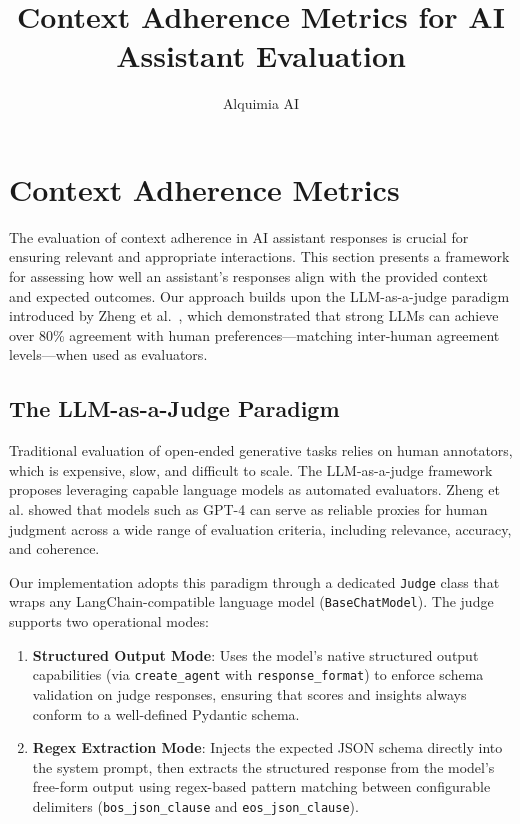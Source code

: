 \documentclass[11pt,a4paper]{article}
\title{Context Adherence Metrics for AI Assistant Evaluation}
\author{Alquimia AI}
\date{}
\begin{document}
\maketitle

\section{Context Adherence Metrics}

The evaluation of context adherence in AI assistant responses is crucial for ensuring relevant and appropriate interactions. This section presents a framework for assessing how well an assistant's responses align with the provided context and expected outcomes. Our approach builds upon the LLM-as-a-judge paradigm introduced by Zheng et al.~\cite{zheng2023judging}, which demonstrated that strong LLMs can achieve over 80\% agreement with human preferences---matching inter-human agreement levels---when used as evaluators.

\subsection{The LLM-as-a-Judge Paradigm}

Traditional evaluation of open-ended generative tasks relies on human annotators, which is expensive, slow, and difficult to scale. The LLM-as-a-judge framework~\cite{zheng2023judging} proposes leveraging capable language models as automated evaluators. Zheng et al. showed that models such as GPT-4 can serve as reliable proxies for human judgment across a wide range of evaluation criteria, including relevance, accuracy, and coherence.

Our implementation adopts this paradigm through a dedicated \texttt{Judge} class that wraps any LangChain-compatible language model (\texttt{BaseChatModel}). The judge supports two operational modes:

\begin{enumerate}
    \item \textbf{Structured Output Mode}: Uses the model's native structured output capabilities (via \texttt{create\_agent} with \texttt{response\_format}) to enforce schema validation on judge responses, ensuring that scores and insights always conform to a well-defined Pydantic schema.
    \item \textbf{Regex Extraction Mode}: Injects the expected JSON schema directly into the system prompt, then extracts the structured response from the model's free-form output using regex-based pattern matching between configurable delimiters (\texttt{bos\_json\_clause} and \texttt{eos\_json\_clause}).
\end{enumerate}
\end{document}
